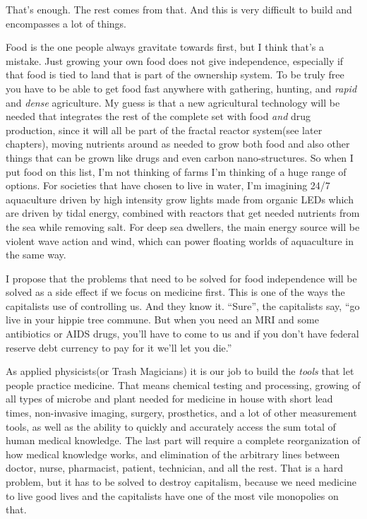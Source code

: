 That's enough. The rest comes from that. And this is very difficult to
build and encompasses a lot of things.

Food is the one people always gravitate towards first, but I think
that's a mistake. Just growing your own food does not give independence,
especially if that food is tied to land that is part of the ownership
system. To be truly free you have to be able to get food fast anywhere
with gathering, hunting, and \emph{rapid} and \emph{dense} agriculture.
My guess is that a new agricultural technology will be needed that
integrates the rest of the complete set with food \emph{and} drug
production, since it will all be part of the fractal reactor system(see
later chapters), moving nutrients around as needed to grow both food and
also other things that can be grown like drugs and even carbon
nano-structures. So when I put food on this list, I'm not thinking of
farms I'm thinking of a huge range of options. For societies that have
chosen to live in water, I'm imagining 24/7 aquaculture driven by high
intensity grow lights made from organic LEDs which are driven by tidal
energy, combined with reactors that get needed nutrients from the sea
while removing salt. For deep sea dwellers, the main energy source will
be violent wave action and wind, which can power floating worlds of
aquaculture in the same way.

I propose that the problems that need to be solved for food independence
will be solved as a side effect if we focus on medicine first. This is
one of the ways the capitalists use of controlling us. And they know it.
``Sure'', the capitalists say, ``go live in your hippie tree commune.
But when you need an MRI and some antibiotics or AIDS drugs, you'll have
to come to us and if you don't have federal reserve debt currency to pay
for it we'll let you die.''

As applied physicists(or Trash Magicians) it is our job to build the
\emph{tools} that let people practice medicine. That means chemical
testing and processing, growing of all types of microbe and plant needed
for medicine in house with short lead times, non-invasive imaging,
surgery, prosthetics, and a lot of other measurement tools, as well as
the ability to quickly and accurately access the sum total of human
medical knowledge. The last part will require a complete reorganization
of how medical knowledge works, and elimination of the arbitrary lines
between doctor, nurse, pharmacist, patient, technician, and all the
rest. That is a hard problem, but it has to be solved to destroy
capitalism, because we need medicine to live good lives and the
capitalists have one of the most vile monopolies on that.

